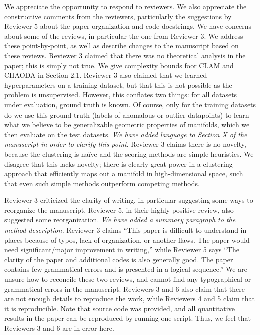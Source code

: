 \documentclass{article}
\begin{document}
We appreciate the opportunity to respond to reviewers.
We also appreciate the constructive comments from the reviewers, particularly the suggestions by Reviewer 5 about the paper organization and code docstrings.
We have concerns about some of the reviews, in particular the one from Reviewer 3.
We address these point-by-point, as well as describe changes to the manuscript based on these reviews.
Reviewer 3 claimed that there was no theoretical analysis in the paper; this is simply not true.
We give complexity bounds foor CLAM and CHAODA in Section 2.1.
Reviewer 3 also claimed that we learned hyperparameters on a training dataset, but that this is not possible as the problem is unsupervised.
However, this conflates two things: for all datasets under evaluation, ground truth is known.
Of course, only for the training datasets do we use this ground truth (labels of anomalous or outlier datapoints) to learn what we believe to be generalizable geometric properties of manifolds, which we then evaluate on the test datasets.
\emph{We have added language to Section X of the manuscript in order to clarify this point}.
Reviewer 3 claims there is no novelty, because the clustering is na\"ive and the scoring methods are simple heuristics.
We disagree that this lacks novelty; there is clearly great power in a clustering approach that efficiently maps out a manifold in high-dimensional space, such that even such simple methods outperform competing methods.

Reviewer 3 criticized the clarity of writing, in particular suggesting some ways to reorganize the manuscript.
Reviewer 5, in their highly positive review, also suggested some reorganization.
\emph{We have added a summary paragraph to the method description.}
Reviewer 3 claims ``This paper is difficult to understand in places because of typos, lack of organization, or another flaws. The paper would need significant/major improvement in writing,'' while Reviewer 5 says ``The clarity of the paper and additional codes is also generally good. The paper contains few grammatical errors and is presented in a logical sequence.''
We are unsure how to reconcile these two reviews, and cannot find any typographical or grammatical errors in the manuscript.
Reviewers 3 and 6 also claim that there are not enough details to reproduce the work, while Reviewers 4 and 5 claim that it is reproducible.
Note that source code was provided, and all quantitative results in the paper can be reproduced by running one script.
Thus, we feel that Reviewers 3 and 6 are in error here.
\end{document}
